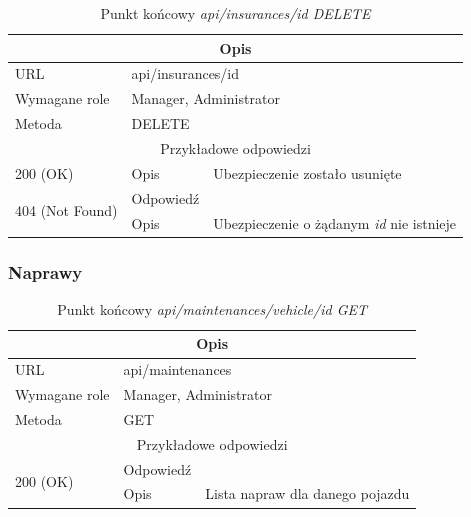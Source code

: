 \documentclass[eng,printmode,openany]{mgr}
\begin{document}
	\begin{table}[H]
		\caption{Punkt końcowy \textit{api/insurances/id DELETE}}
		\begin{tabularx}{\textwidth}{|l|l|X|}
			\hline
			\multicolumn{3}{|c|}{Opis}                         						\\ \hline
			URL                       & \multicolumn{2}{l|}{api/insurances/id} 	    \\ \hline
			Wymagane role             & \multicolumn{2}{l|}{Manager, Administrator} \\ \hline
			Metoda                    & \multicolumn{2}{l|}{DELETE} 				\\ \hline
			\multicolumn{3}{|c|}{ Przykładowe odpowiedzi}                   		\\ \hline
			200 (OK)			& Opis         	& Ubezpieczenie zostało usunięte	\\ \hline
			\multirow{2}{*}{404 (Not Found)} 	& Odpowiedź     &     \\ \cline{2-3} 
			& Opis          & Ubezpieczenie o żądanym \textit{id} nie istnieje  							        \\ \hline		
		\end{tabularx}
	\end{table}
	
	\subsubsection{Naprawy}
	\begin{table}[H]
		\caption{Punkt końcowy \textit{api/maintenances/vehicle/id GET}}
		\begin{tabularx}{\textwidth}{|l|l|X|}
			\hline
			\multicolumn{3}{|c|}{Opis}                         						\\ \hline
			URL                       & \multicolumn{2}{l|}{api/maintenances} 	    \\ \hline
			Wymagane role             & \multicolumn{2}{l|}{Manager, Administrator}               \\ \hline
			Metoda                    & \multicolumn{2}{l|}{GET} 					\\ \hline
			\multicolumn{3}{|c|}{ Przykładowe odpowiedzi}                   		\\ \hline
			\multirow{2}{*}{200 (OK)} 			& Odpowiedź     &      \\ \cline{2-3} 
			& Opis         	& Lista napraw dla danego pojazdu		      		                                \\ \hline
		\end{tabularx}
	\end{table}
	
\end{document}
